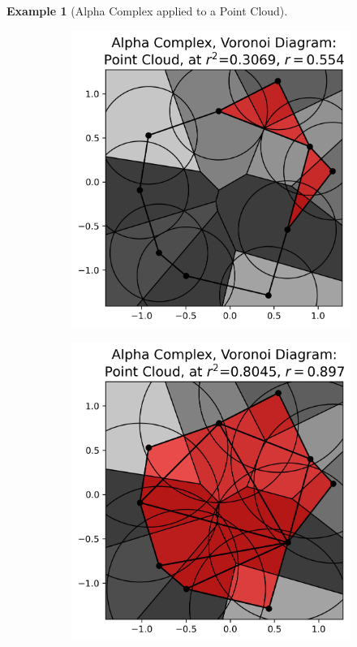 \documentclass[ma]{uncgdissertationexp}
\theoremstyle{plain}
\theoremstyle{definition}
\newtheorem{example}[theorem]{Example}
\theoremstyle{remark}
\begin{document}
\begin{example}[Alpha Complex applied to a Point Cloud]
\begin{figure}[H]
\begin{subfigure}[b]{0.28\textwidth}
    \end{subfigure}
    \hfill
    \begin{subfigure}[b]{0.28\textwidth}
        \includegraphics[width=\textwidth]{point_cloud_plot_alpha_5.png}
    \end{subfigure}
    \hfill
    \begin{subfigure}[b]{0.28\textwidth}
        \includegraphics[width=\textwidth]{point_cloud_plot_alpha_6.png}

\end{subfigure}
\end{figure}
\end{example}
\end{document}
